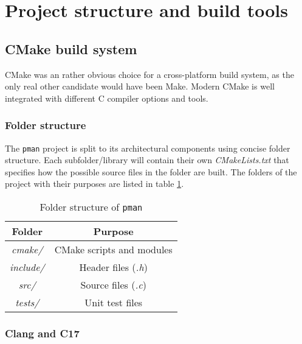 \section{Project structure and build tools}

\subsection{CMake build system}

CMake was an rather obvious choice for a cross-platform build system, as the
only real other candidate would have been Make. Modern CMake is well integrated
with different C compiler options and tools.

\subsubsection{Folder structure}

The \texttt{pman} project is split to its architectural components using concise
folder structure. Each subfolder/library will contain their own \textit{CMakeLists.txt}
that specifies how the possible source files in the folder are built. The folders
of the project with their purposes are listed in table \ref{tab:folder}.

\begin{table}[h]
    \centering
    \begin{tabular}{|c|c|}
        \hline
        Folder & Purpose \\

        \hline
        \textit{cmake/} & CMake scripts and modules \\

        \hline
        \textit{include/} & Header files (\textit{.h}) \\

        \hline
        \textit{src/} & Source files (\textit{.c}) \\

        \hline
        \textit{tests/} & Unit test files \\

        \hline
    \end{tabular}
    \caption{Folder structure of \texttt{pman}}
    \label{tab:folder}
\end{table}

\subsubsection{Clang and C17}

